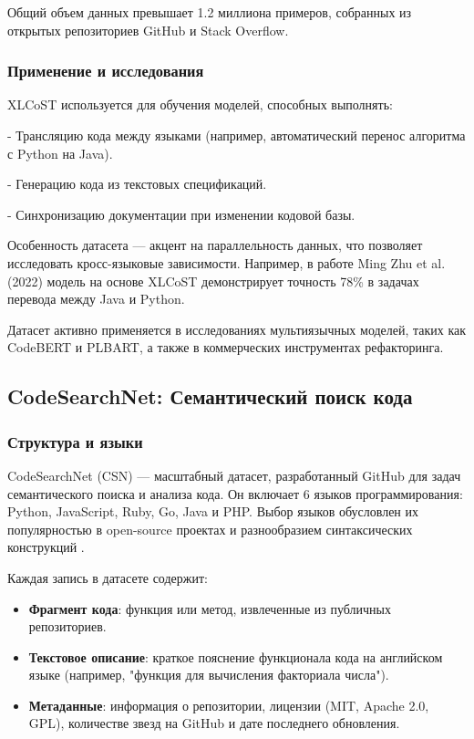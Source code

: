 \documentclass[14pt]{article}
\theoremstyle{definition}
\begin{document}
Общий объем данных превышает 1.2 миллиона примеров, собранных из открытых репозиториев GitHub и Stack Overflow.

\subsubsection{Применение и исследования}
XLCoST используется для обучения моделей, способных выполнять:

    
- Трансляцию кода между языками (например, автоматический перенос алгоритма с Python на Java).
    
- Генерацию кода из текстовых спецификаций.
    
- Синхронизацию документации при изменении кодовой базы.


Особенность датасета — акцент на параллельность данных, что позволяет исследовать кросс-языковые зависимости. Например, в работе Ming Zhu et al. (2022) модель на основе XLCoST демонстрирует точность 78\% в задачах перевода между Java и Python.

Датасет активно применяется в исследованиях мультиязычных моделей, таких как CodeBERT и PLBART, а также в коммерческих инструментах рефакторинга.



\newpage

\subsection{CodeSearchNet: Семантический поиск кода}

\subsubsection{Структура и языки}
CodeSearchNet (CSN) — масштабный датасет, разработанный GitHub для задач семантического поиска и анализа кода. Он включает 6 языков программирования: Python, JavaScript, Ruby, Go, Java и PHP. Выбор языков обусловлен их популярностью в open-source проектах и разнообразием синтаксических конструкций \cite{husain2019codesearchnet}. 

Каждая запись в датасете содержит:
\begin{itemize}
    \item \textbf{Фрагмент кода}: функция или метод, извлеченные из публичных репозиториев.
    \item \textbf{Текстовое описание}: краткое пояснение функционала кода на английском языке (например, "функция для вычисления факториала числа").
    \item \textbf{Метаданные}: информация о репозитории, лицензии (MIT, Apache 2.0, GPL), количестве звезд на GitHub и дате последнего обновления.
\end{itemize}
\end{document}
